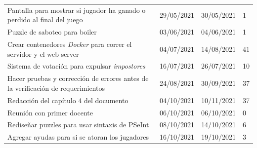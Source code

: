 \begin{longtable}[c]{m{} m{} m{} m{}}
        Pantalla para mostrar si jugador ha ganado o perdido al final del juego & 29/05/2021 & 30/05/2021 & 1 \\  
        Puzzle de saboteo para boiler & 03/06/2021 & 04/06/2021 & 1 \\  
        Crear contenedores \textit{Docker} para correr el servidor y el web server & 04/07/2021 & 14/08/2021 & 41 \\  
        Sistema de votación para expulsar \textit{impostores} & 16/07/2021 & 26/07/2021 & 10 \\  
        Hacer pruebas y corrección de errores antes de la verificación de requerimientos & 24/08/2021 & 30/09/2021 & 37 \\  
        Redacción del capítulo 4 del documento & 04/10/2021 & 10/11/2021 & 37 \\  
        Reunión con primer docente & 06/10/2021 & 06/10/2021 & 0 \\  
        Rediseñar puzzles para usar sintaxis de PSeInt & 08/10/2021 & 14/10/2021 & 6 \\  
        Agregar ayudas para si se atoran los jugadores & 16/10/2021 & 19/10/2021 & 3 \\  

\end{longtable}
